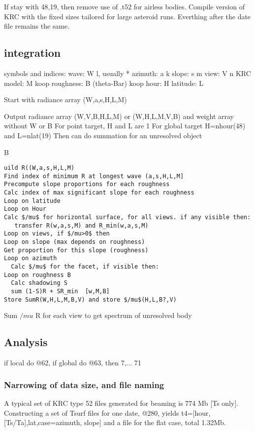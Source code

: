 \documentclass{article}
\begin{document}
If stay with 48,19, then remove use of .t52 for airless bodies. Compile version of KRC with the fixed sizes tailored for large asteroid runs. Everthing after the date file remains the same.

\subsection{integration}
symbols and indices:
\qi wave: W l, usually *
\qi azimuth: a k 
\qi slope: s m
\qi view:  V n
\qi KRC model: M koop
\qi roughness: B (theta-Bar) koop
\qi hour: H
\qi latitude: L

Start with radiance array (W,a,s,H,L,M)

Output radiance array (W,V,B,H,L,M) or (W,H,L,M,V,B)  and weight array without W or B
\qi For point target, H and L are 1
\qi For global target H=nhour(48) and L=nlat(19)
\qii Then can do summation for an unresolved object

B 
\begin{verbatim}
uild R((W,a,s,H,L,M)
Find index of minimum R at longest wave (a,s,H,L,M]
Precompute slope proportions for each roughness
Calc index of max significant slope for each roughness
Loop on latitude
Loop on Hour
Calc $/mu$ for horizontal surface, for all views. if any visible then:
   transfer R(w,a,s,M) and R_min(w,a,s,M)
Loop on views, if $/mu>0$ then
Loop on slope (max depends on roughness)
Get proportion for this slope (roughness)
Loop on azimuth
  Calc $/mu$ for the facet, if visible then:
Loop on roughness B
  Calc shadowing S 
  sum (1-S)R + SR_min  [w,M,B]
Store SumR(W,H,L,M,B,V) and store $/mu$(H,L,B?,V)
\end{verbatim} 

Sum $/mu$ R for each view to get spectrum of unresolved body

\subsection{Analysis}

 if local do @62, if global do @63, then 7,... 71

\subsubsection{Narrowing of data size, and file naming}
A typical set of KRC type 52 files generated for beaming is 774 Mb [Ts
  only]. Constructing a set of Tsurf files for one date, @280, yields
t4=[hour,[Ts/Ta],lat,case=azimuth, slope] and a file for the flat case, total
1.32Mb. 
 
\end{document}
